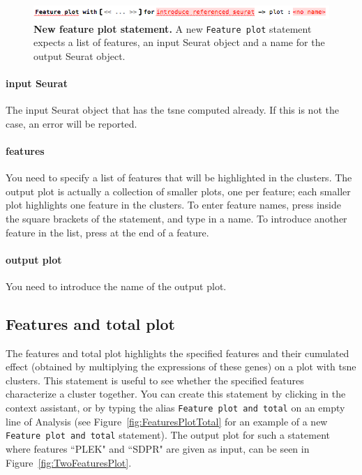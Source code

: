 \begin{figure}[h!tbp]
  \centering
  \includegraphics[width=\figWidthWide]{figures/FeaturesPlot.png}
    \caption[New feature plot statement.]{\textbf{New feature plot statement.} A new
    \texttt{Feature plot} statement expects a list of features, an input Seurat object
    and a name for the output Seurat object.}
\label{fig:FeaturesPlot}
\end{figure}

\paragraph{input Seurat} The input Seurat object that has the tsne computed already. If this
is not the case, an error will be reported.

\paragraph{features} You need to specify a list of features that will be highlighted in the
clusters. The output plot is actually a collection of smaller plots, one per feature; each
smaller plot highlights one feature in the clusters. To enter feature names, press \keys{\return}
inside the square brackets of the statement, and type in a name. To introduce another
feature in the list, press \keys{\return} at the end of a feature.

\paragraph{output plot} You need to introduce the name of the output plot.

\subsection{Features and total plot}
The features and total plot highlights the specified features and their cumulated effect
(obtained by multiplying the expressions of these genes) on a plot with tsne clusters. This statement
is useful to see whether the specified features characterize a cluster together.
You can create this statement by clicking
 in the context assistant, or by typing
the alias \texttt{Feature plot and total} on an empty line of Analysis (see Figure~\ref{fig:FeaturesPlotTotal}
for an example of a new \texttt{Feature plot and total} statement). The output plot
for such a statement where features ``PLEK" and ``SDPR" are given as input, can be seen in
Figure~\ref{fig:TwoFeaturesPlot}.

